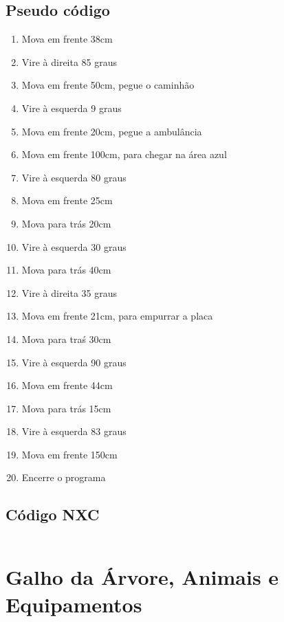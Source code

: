 \documentclass[12pt,a4paper]{article}
\begin{document}
	\subsection{Pseudo código}
		\begin{enumerate}
			\item Mova em frente 38cm
		    \item Vire à direita 85 graus
		    \item Mova em frente 50cm, pegue o caminhão
			\item Vire à esquerda 9 graus
			\item Mova em frente 20cm, pegue a ambulância
			\item Mova em frente 100cm, para chegar na área azul
		    \item Vire à esquerda 80 graus
			\item Mova em frente 25cm
			\item Mova para trás 20cm
		    \item Vire à esquerda 30 graus
		    \item Mova para trás 40cm
		    \item Vire à direita 35 graus
		    \item Mova em frente 21cm, para empurrar a placa
		    \item Mova para traś 30cm
		    \item Vire à esquerda 90 graus
		    \item Mova em frente 44cm
		    \item Mova para trás 15cm
		    \item Vire à esquerda 83 graus
		    \item Mova em frente 150cm
		    \item Encerre o programa
		\end{enumerate}

	\subsection{Código NXC}
		\inputminted[linenos, frame = single]{c}{../Ambulancia.nxc}

\newpage
\section{Galho da Árvore, Animais e Equipamentos}
\end{document}
